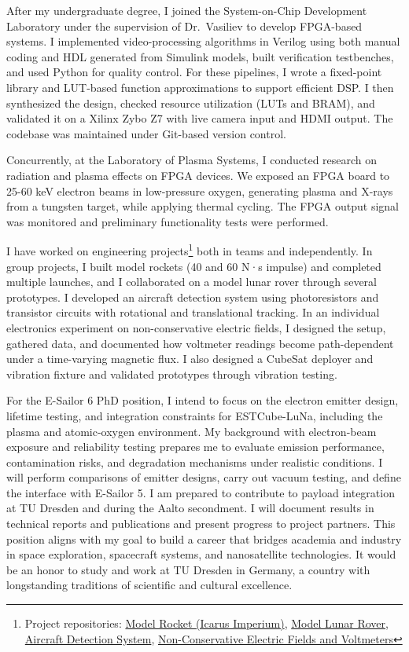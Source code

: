 \documentclass[a4paper,12pt]{article}
\begin{document}
After my undergraduate degree, I joined the System-on-Chip Development Laboratory under the supervision of Dr.\ Vasiliev to develop FPGA-based systems. I implemented video-processing algorithms in Verilog using both manual coding and HDL generated from Simulink models, built verification testbenches, and used Python for quality control. For these pipelines, I wrote a fixed-point library and LUT-based function approximations to support efficient DSP. I then synthesized the design, checked resource utilization (LUTs and BRAM), and validated it on a Xilinx Zybo Z7 with live camera input and HDMI output. The codebase was maintained under Git-based version control.

Concurrently, at the Laboratory of Plasma Systems, I conducted research on radiation and plasma effects on FPGA devices. We exposed an FPGA board to 25-60 keV electron beams in low-pressure oxygen, generating plasma and X-rays from a tungsten target, while applying thermal cycling. The FPGA output signal was monitored and preliminary functionality tests were performed.

I have worked on engineering projects\footnote{Project repositories: \href{https://github.com/icarus-imperium/rocket-2025}{Model Rocket (Icarus Imperium)}, \href{https://github.com/rezaaliasgarirenani/Rover}{Model Lunar Rover}, \href{https://github.com/rezaaliasgarirenani/Aircraft-Detection-System}{Aircraft Detection System}, \href{https://github.com/rezaaliasgarirenani/Non-Conservative-Electric-Fields-and-Voltmeters}{Non-Conservative Electric Fields and Voltmeters}} both in teams and independently. In group projects, I built model rockets (40 and 60 N·s impulse) and completed multiple launches, and I collaborated on a model lunar rover through several prototypes. I developed an aircraft detection system using photoresistors and transistor circuits with rotational and translational tracking. In an individual electronics experiment on non-conservative electric fields, I designed the setup, gathered data, and documented how voltmeter readings become path-dependent under a time-varying magnetic flux. I also designed a CubeSat deployer and vibration fixture and validated prototypes through vibration testing.

For the E-Sailor 6 PhD position, I intend to focus on the electron emitter design, lifetime testing, and integration constraints for ESTCube-LuNa, including the plasma and atomic-oxygen environment. My background with electron-beam exposure and reliability testing prepares me to evaluate emission performance, contamination risks, and degradation mechanisms under realistic conditions. I will perform comparisons of emitter designs, carry out vacuum testing, and define the interface with E-Sailor 5. I am prepared to contribute to payload integration at TU Dresden and during the Aalto secondment. I will document results in technical reports and publications and present progress to project partners. This position aligns with my goal to build a career that bridges academia and industry in space exploration, spacecraft systems, and nanosatellite technologies. It would be an honor to study and work at TU Dresden in Germany, a country with longstanding traditions of scientific and cultural excellence.
\end{document}
